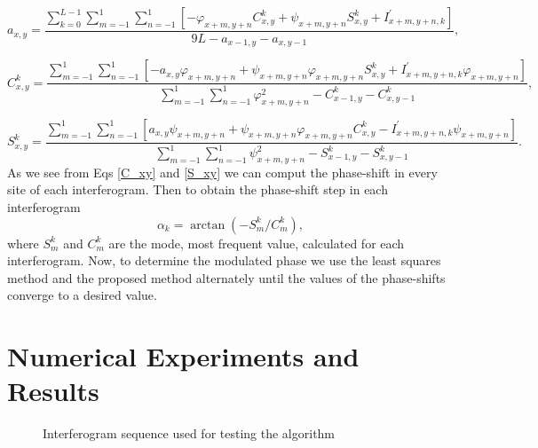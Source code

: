 \documentclass[letterpaper,12pt]{article}   %
\begin{document}
\begin{equation}
a_{x,y} = \frac{ \sum_{k=0}^{L-1} \sum_{m=-1}^{1} \sum_{n=-1}^{1} \left[ -\varphi_{x+m,y+n}C_{x,y}^k+\psi_{x+m,y+n}S_{x,y}^k+I_{x+m,y+n,k}^{'} \right] } { 9L - a_{x-1,y}-a_{x,y-1}},
\end{equation}

\begin{equation}\label{C_xy}
C_{x,y}^k = \frac{ \sum_{m=-1}^{1} \sum_{n=-1}^{1} \left[ -a_{x,y} \varphi_{x+m,y+n}+ \psi_{x+m,y+n} \varphi_{x+m,y+n} S_{x,y}^k + I_{x+m,y+n,k}^{'} \varphi_{x+m,y+n} \right] } { \sum_{m=-1}^{1} \sum_{n=-1}^{1} \varphi_{x+m,y+n}^2 -C_{x-1,y}^k-C_{x,y-1}^k },
\end{equation}

\begin{equation}\label{S_xy}
S_{x,y}^k = \frac{ \sum_{m=-1}^{1} \sum_{n=-1}^{1} \left[ a_{x,y} \psi_{x+m,y+n} + \psi_{x+m,y+n} \varphi_{x+m,y+n} C_{x,y}^k - I_{x+m,y+n,k}^{'} \psi_{x+m,y+n} \right] } { \sum_{m=-1}^{1} \sum_{n=-1}^{1} \psi_{x+m,y+n}^2 - S_{x-1,y}^k - S_{x,y-1}^k }.
\end{equation}
As we see from Eqs \ref{C_xy} and \ref{S_xy} we can comput the phase-shift in every site of each interferogram. Then to obtain the phase-shift step in each interferogram
\begin{equation}
\alpha_k = \arctan(-S_m^k/C_m^k),
\end{equation}
where $S_m^k$ and $C_m^k$ are the mode, most frequent value, calculated for each interferogram.
Now, to determine the modulated phase we use the least squares method and the proposed method alternately until the values ​​of the phase-shifts converge to a desired value.

\section{Numerical Experiments and Results}

\begin{figure}[th]
	\begin{center}
	\end{center}
	\caption{Interferogram sequence used for testing the algorithm} 
	\label{fig:Interferograms}
\end{figure}
\end{document}
